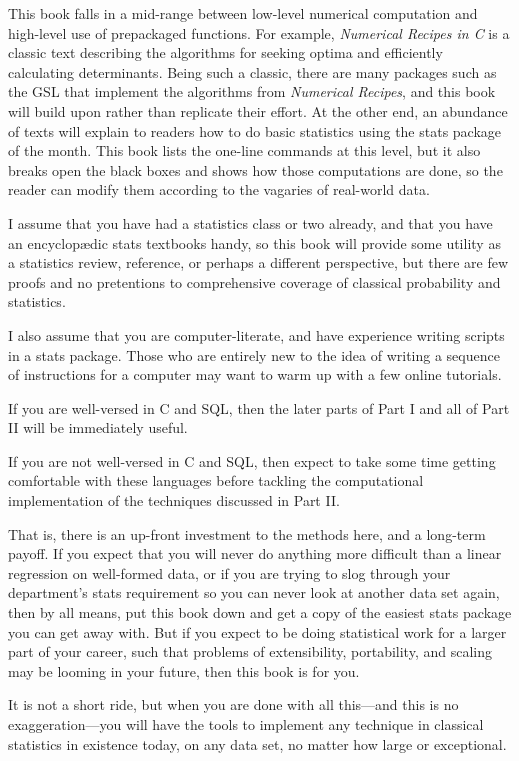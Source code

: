 \begin{multicols}{2}
This book falls in a mid-range between low-level numerical
computation and high-level use of prepackaged functions. For example,
{\sl Numerical Recipes in C} \citep{recipesinc} is a classic text
describing the algorithms for seeking optima and efficiently calculating
determinants. Being such a classic, there are many packages such as the
GSL that implement the algorithms from {\sl Numerical Recipes}, and this
book will build upon rather than replicate their effort. At the other
end, an abundance of texts will explain to readers how to do basic
statistics using the stats package of the month. This book lists the
one-line commands at this level, but it also breaks open the black boxes
and shows how those computations are done, so the reader can modify them
according to the vagaries of real-world data.

I assume that you have had a statistics class or two already, and that
you have an encyclop\ae{}dic stats textbooks handy, so this book will
provide some utility as a statistics review, reference, or perhaps a
different perspective, but there are few proofs and no pretentions to
comprehensive coverage of classical probability and statistics.

I also assume that you are computer-literate, and have experience writing
scripts in a stats package. Those who are entirely new to the idea of
writing a sequence of instructions for a computer may want to warm up
with a few online tutorials.

If you are well-versed in C and SQL, then the later parts of Part I and
all of Part II will be immediately useful.

If you are not well-versed in C and SQL, then expect to take some time
getting comfortable with these languages before tackling the computational
implementation of the techniques discussed in Part II.

That is, there is an up-front investment to the methods here, and a
long-term payoff. If you expect that you will never do anything more
difficult than a linear regression on well-formed  data, or
if you are trying to slog through your department's stats requirement
so you can never look at another data set again, then by all means, put
this book down and get a copy of the easiest stats package you can get
away with. But if you expect to be doing statistical work for a larger
part of your career, such that problems of extensibility, portability,
and scaling may be looming in your future, then this book is for you.

It is not a short ride, but when you are done with all this---and this
is no exaggeration---you will have the tools to implement any technique
in classical statistics in existence today, on any data set, no matter
how large or exceptional.


\end{multicols}

